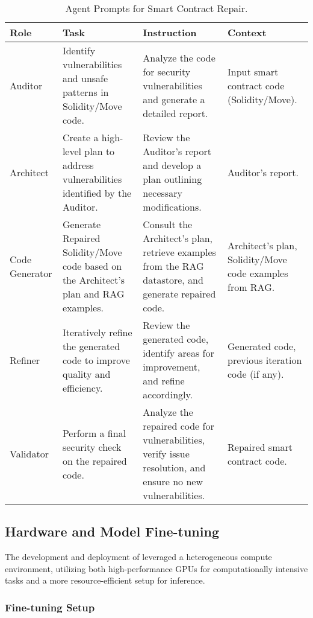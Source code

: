 \begin{table}[ht]
\centering
\caption{Agent Prompts for Smart Contract Repair.}
\label{tab:agent-prompts}
\renewcommand{\arraystretch}{1.2} %
\setlength{\tabcolsep}{4pt} %
\begin{tabularx}{\linewidth}{|p{1.5cm}|X|X|p{2.5cm}|}
\hline
\textbf{Role} & \textbf{Task} & \textbf{Instruction} & \textbf{Context} \\ \hline
Auditor & Identify vulnerabilities and unsafe patterns in Solidity/Move code. & Analyze the code for security vulnerabilities and generate a detailed report. & Input smart contract code (Solidity/Move). \\ \hline
Architect & Create a high-level plan to address vulnerabilities identified by the Auditor. & Review the Auditor's report and develop a plan outlining necessary modifications. & Auditor's report. \\ \hline
Code Generator & Generate Repaired Solidity/Move code based on the Architect's plan and RAG examples. & Consult the Architect's plan, retrieve examples from the RAG datastore, and generate repaired code. & Architect's plan, Solidity/Move code examples from RAG. \\ \hline
Refiner & Iteratively refine the generated code to improve quality and efficiency. & Review the generated code, identify areas for improvement, and refine accordingly. & Generated code, previous iteration code (if any). \\ \hline
Validator & Perform a final security check on the repaired code. & Analyze the repaired code for vulnerabilities, verify issue resolution, and ensure no new vulnerabilities. & Repaired smart contract code. \\ \hline
\end{tabularx}
\end{table}

\subsection{Hardware and Model Fine-tuning}

The development and deployment of \sln{} leveraged a heterogeneous compute environment, utilizing both high-performance GPUs for computationally intensive tasks and a more resource-efficient setup for inference.

\subsubsection{Fine-tuning Setup}

